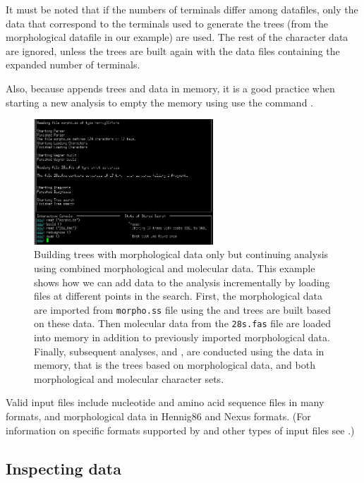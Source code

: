 It must be noted that if the numbers of terminals differ among datafiles, only the data that correspond to the terminals used to generate the trees (from the morphological datafile in our example) are used. The rest of the character data are ignored, unless the trees are built again with the data files containing the expanded number of terminals.

Also, because \poy appends trees and data in memory, it is a good practice when starting a new analysis to empty the memory using use the command .

\begin{figure}[]
    \begin{center}
        \includegraphics[width=0.6\textwidth]{figures/reading_example2.jpg}
    \end{center}
    \caption{Building trees with morphological data only but continuing analysis using combined morphological and molecular data. This example shows how we can add data to the analysis incrementally by loading files at different points in the search. First, the morphological data are imported from \texttt{morpho.ss} file using  the and trees are built based on these data. Then molecular data from the \texttt{28s.fas} file are loaded into memory in addition to previously imported morphological data. Finally, subsequent analyses,  and , are conducted using the data in memory, that is the trees based on morphological data, and both morphological and molecular character sets.}
    \label{fig:reading_example2}
\end{figure}

Valid input files include nucleotide and amino acid sequence files in many formats,
and morphological data in Hennig86 and Nexus formats. (For information on specific formats supported by \poy and other types of input files see .)

\subsection{Inspecting data}

